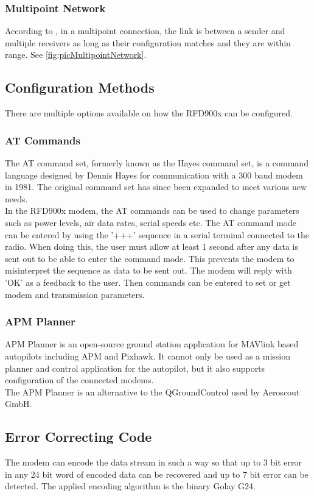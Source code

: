 \subsubsection{Multipoint Network}
%
According to \cite{RFD900x_Datasheet}, in a multipoint connection, the link is between a sender and multiple receivers as long as their configuration matches and they are within range. See \autoref{fig:picMultipointNetwork}.
%
%
\subsection{Configuration Methods}
There are multiple options available on how the RFD900x can be configured.
%
\subsubsection{AT Commands}
The AT command set, formerly known as the Hayes command set, is a command language designed by Dennis Hayes for communication with a 300 baud modem in 1981. The original command set has since been expanded to meet various new needs.\\
In the RFD900x modem, the AT commands can be used to change parameters such as power levels, air data rates, serial speeds etc. The AT command mode can be entered by using the '+++' sequence in a serial terminal connected to the radio. When doing this, the user must allow at least 1 second after any data is sent out to be able to enter the command mode. This prevents the modem to misinterpret the sequence as data to be sent out. The modem will reply with 'OK' as a feedback to the user. Then commands can be entered to set or get modem and transmission parameters.
%
\subsubsection{APM Planner}
APM Planner is an open-source ground station application for MAVlink based autopilots including APM and Pixhawk. It cannot only be used as a mission planner and control application for the autopilot, but it also supports configuration of the connected modems.\\
The APM Planner is an alternative to the QGroundControl used by Aeroscout GmbH.
%
%
\subsection{Error Correcting Code}
The modem can encode the data stream in such a way so that up to 3 bit error in any 24 bit word of encoded data can be recovered and up to 7 bit error can be detected. The applied encoding algorithm is the binary Golay G24.
%
%

